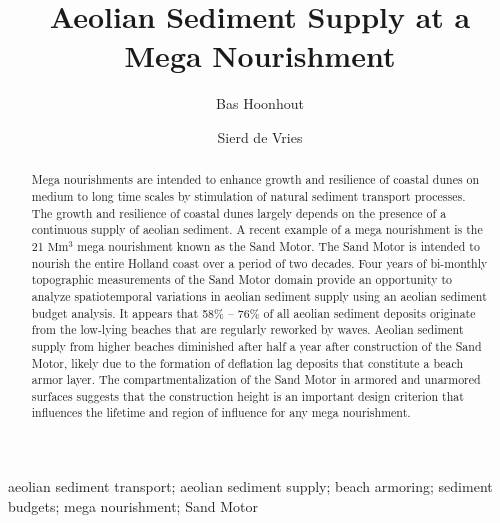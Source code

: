 \documentclass[preprint,12pt,authoryear]{elsarticle}
\begin{document}
\begin{frontmatter}

  \title{Aeolian Sediment Supply at a Mega Nourishment}

  \author[tudelft,deltares]{Bas Hoonhout}

  \author[tudelft]{Sierd de Vries}

  \address[tudelft]{Delft University of Technology, Faculty of Civil
    Engineering and Geosciences, Department of Hydraulic Engineering,
    Stevinweg 1, 2628CN Delft, The Netherlands.}

  \address[deltares]{Deltares, Department of Hydraulic Engineering,
    Boussinesqweg 1, 2629HV Delft, The Netherlands.}

  \begin{abstract}
    Mega nourishments are intended to enhance growth and resilience of
    coastal dunes on medium to long time scales by stimulation of
    natural sediment transport processes. The growth and resilience of
    coastal dunes largely depends on the presence of a continuous
    supply of aeolian sediment. A recent example of a mega nourishment
    is the 21 $\mathrm{Mm^3}$ mega nourishment known as the Sand
    Motor. The Sand Motor is intended to nourish the entire Holland
    coast over a period of two decades. Four years of bi-monthly
    topographic measurements of the Sand Motor domain provide an
    opportunity to analyze spatiotemporal variations in aeolian
    sediment supply using an aeolian sediment budget analysis. It
    appears that 58\% -- 76\% of all aeolian sediment deposits
    originate from the low-lying beaches that are regularly reworked
    by waves. Aeolian sediment supply from higher beaches diminished
    after half a year after construction of the Sand Motor, likely due
    to the formation of deflation lag deposits that constitute a beach
    armor layer. The compartmentalization of the Sand Motor in armored
    and unarmored surfaces suggests that the construction height is an
    important design criterion that influences the lifetime and region
    of influence for any mega nourishment.
  \end{abstract}

  \begin{keyword}
    aeolian sediment transport; aeolian sediment supply; beach
    armoring; sediment budgets; mega nourishment; Sand Motor
  \end{keyword}

\end{frontmatter}
\end{document}
